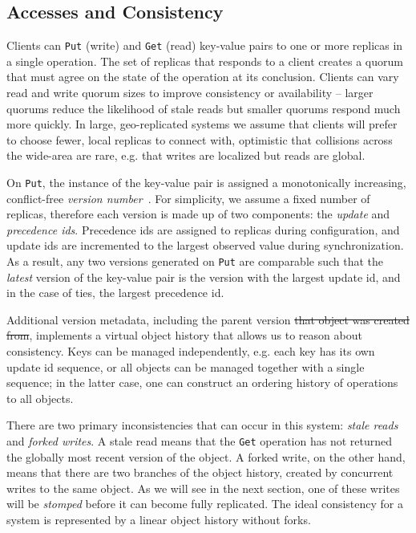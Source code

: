\subsection*{Accesses and Consistency}

Clients can \texttt{Put} (write) and \texttt{Get} (read) key-value pairs to
one or more replicas in a single operation.
The set of replicas that responds to a client creates a quorum that must
agree on the state of the operation at its conclusion.
Clients can vary read and write quorum sizes to improve consistency or
availability -- larger quorums reduce the likelihood of stale reads but
smaller quorums respond much more quickly.
In large, geo-replicated systems we assume that clients will prefer to choose
fewer, local replicas to connect with, optimistic that collisions across the
wide-area are rare, e.g. that writes are localized but reads are global.

On \texttt{Put}, the instance of the key-value pair is assigned a
monotonically increasing, conflict-free \textit{version
number}~\cite{almeida_version_2002}.
For simplicity, we assume a fixed number of replicas, therefore each version
is made up of two components: the \textit{update} and \textit{precedence ids}.
Precedence ids are assigned to replicas during configuration, and update ids
are incremented to the largest observed value during synchronization.
As a result, any two versions generated on \texttt{Put} are comparable such
that the \textit{latest} version of the key-value pair is the version with the
largest update id, and in the case of ties, the largest precedence id.

Additional version metadata, including the parent version \sout{that object was
created from}, implements a virtual object history that allows us to reason
about consistency.
Keys can be managed independently, e.g. each key has its own update id
sequence, or all objects can be managed together with a single sequence; in
the latter case, one can construct an ordering history of
operations to all objects.

There are two primary inconsistencies that can occur in this system:
\textit{stale reads} and \textit{forked writes}.
A stale read means that the \texttt{Get} operation has not returned
the globally most recent version of the object.
A forked write, on the other hand, means that there are two branches of the
object history, created by concurrent writes to the same object.
As we will see in the next section, one of these writes will be
\textit{stomped} before it can become fully replicated.
The ideal consistency for a system is represented by a linear object history
without forks.

